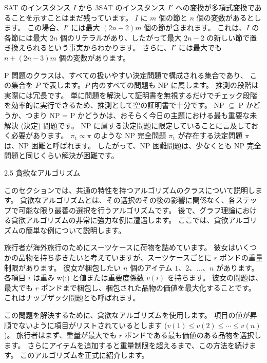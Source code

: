 
SAT のインスタンス $I$ から 3SAT のインスタンス $I'$ への変換が多項式変換であることを示すことはまだ残っています。
$I$ に $m$ 個の節と $n$ 個の変数があるとします。 この場合、$I'$ には最大 $(2n-2)m$ 個の節が含まれます。 
これは、$I$ の各節には最大 $2n$ 個のリテラルがあり、したがって最大 $2n-2$ の新しい節で置き換えられるという事実からわかります。
さらに、$I'$ には最大でも $n+(2n-3)m$ 個の変数があります。

P 問題のクラスは、すべての扱いやすい決定問題で構成される集合であり、
この集合を $P$ で表します。$P$ 内のすべての問題も NP に属します。 推測の段階は実際には冗長です。 
単に問題を解決して証明書を無視するだけでチェック段階を効率的に実行できるため、推測として空の証明書で十分です。
NP $\subseteq$ P かどうか、つまり NP = P かどうかは、おそらく今日の主題における最も重要な未解決 (決定) 問題です。 
NP に属する決定問題に限定していることに言及しておく必要があります。 $\pi_1 \propto \pi$ のような NP 完全問題
$\pi_1$ が存在する決定問題 $\pi$ は、NP 困難と呼ばれます。 
したがって、NP 困難問題は、少なくとも NP 完全問題と同じくらい解決が困難です。

2.5 貪欲なアルゴリズム

このセクションでは、共通の特性を持つアルゴリズムのクラスについて説明します。 
貪欲なアルゴリズムとは、その選択のその後の影響に関係なく、各ステップで可能な限り最善の選択を行うアルゴリズムです。 
後で、グラフ理論における貪欲アルゴリズムの非常に強力な例に遭遇します。 
ここでは、貪欲アルゴリズムの簡単な例について説明します。

旅行者が海外旅行のためにスーツケースに荷物を詰めています。
彼女はいくつかの品物を持ち歩きたいと考えていますが、スーツケースごとに $r$ ポンドの重量制限があります。
彼女が梱包したい $n$ 個のアイテム $1、2、\dots、n$ があります。 
各項目 $i$ は重み w(i) と値または重要度係数 $v(i)$ を持ちます。 
彼女の問題は、最大でも $r$ ポンドまで梱包し、梱包された品物の価値を最大化することです。
これはナップザック問題とも呼ばれます。

この問題を解決するために、貪欲なアルゴリズムを使用します。
項目の値が昇順でないように項目がリストされているとします ($v(1) \leq v(2) \leq \cdots \leq v(n)$)。 
旅行者はまず、重量が最大でも $r$ ポンドである最も価値のある品物を選択します。
さらにアイテムを追加すると重量制限を超えるまで、この方法を続けます。 
このアルゴリズムを正式に紹介します。